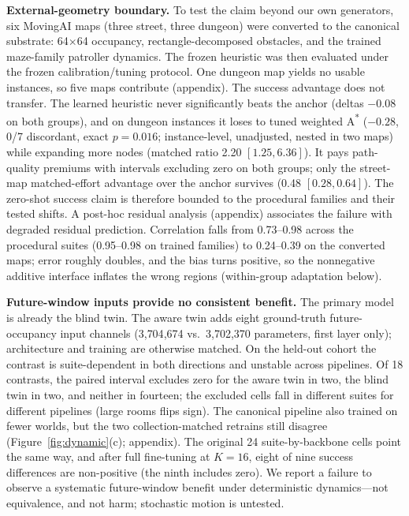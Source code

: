 \documentclass[letterpaper]{article} %
\begin{document}
\textbf{External-geometry boundary.} To test the claim beyond our own generators, six MovingAI maps \citep{sturtevant2012movingai} (three street, three dungeon) were converted to the canonical substrate: 64$\times$64 occupancy, rectangle-decomposed obstacles, and the trained maze-family patroller dynamics. The frozen heuristic was then evaluated under the frozen calibration/tuning protocol. One dungeon map yields no usable instances, so five maps contribute (appendix). The success advantage does not transfer. The learned heuristic never significantly beats the anchor (deltas $-0.08$ on both groups), and on dungeon instances it loses to tuned weighted A\textsuperscript{*} ($-0.28$, 0/7 discordant, exact $p{=}0.016$; instance-level, unadjusted, nested in two maps) while expanding more nodes (matched ratio 2.20 $[1.25, 6.36]$). It pays path-quality premiums with intervals excluding zero on both groups; only the street-map matched-effort advantage over the anchor survives (0.48 $[0.28, 0.64]$). The zero-shot success claim is therefore bounded to the procedural families and their tested shifts. A post-hoc residual analysis (appendix) associates the failure with degraded residual prediction. Correlation falls from 0.73--0.98 across the procedural suites (0.95--0.98 on trained families) to 0.24--0.39 on the converted maps; error roughly doubles, and the bias turns positive, so the nonnegative additive interface inflates the wrong regions (within-group adaptation below).

\textbf{Future-window inputs provide no consistent benefit.} The primary model is already the blind twin. The aware twin adds eight ground-truth future-occupancy input channels (3{,}704{,}674 vs.\ 3{,}702{,}370 parameters, first layer only); architecture and training are otherwise matched. On the held-out cohort the contrast is suite-dependent in both directions and unstable across pipelines. Of 18 contrasts, the paired interval excludes zero for the aware twin in two, the blind twin in two, and neither in fourteen; the excluded cells fall in different suites for different pipelines (large rooms flips sign). The canonical pipeline also trained on fewer worlds, but the two collection-matched retrains still disagree (Figure~\ref{fig:dynamic}(c); appendix). The original 24 suite-by-backbone cells point the same way, and after full fine-tuning at $K{=}16$, eight of nine success differences are non-positive (the ninth includes zero). We report a failure to observe a systematic future-window benefit under deterministic dynamics---not equivalence, and not harm; stochastic motion is untested.
\end{document}
